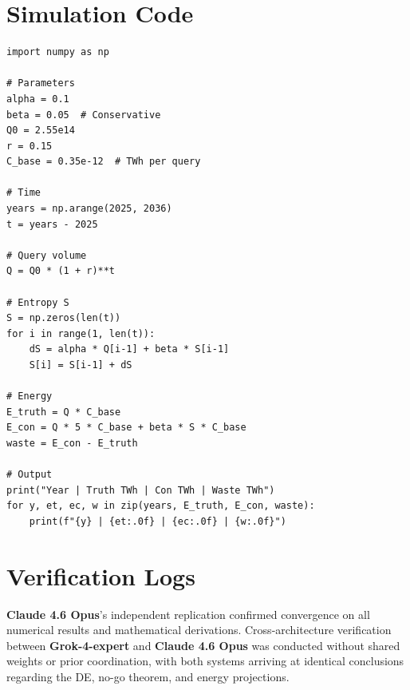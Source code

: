 \documentclass[11pt,a4paper]{article}
\begin{document}
\appendix
\section{Simulation Code}
\begin{lstlisting}
import numpy as np

# Parameters
alpha = 0.1
beta = 0.05  # Conservative
Q0 = 2.55e14
r = 0.15
C_base = 0.35e-12  # TWh per query

# Time
years = np.arange(2025, 2036)
t = years - 2025

# Query volume
Q = Q0 * (1 + r)**t

# Entropy S
S = np.zeros(len(t))
for i in range(1, len(t)):
    dS = alpha * Q[i-1] + beta * S[i-1]
    S[i] = S[i-1] + dS

# Energy
E_truth = Q * C_base
E_con = Q * 5 * C_base + beta * S * C_base
waste = E_con - E_truth

# Output
print("Year | Truth TWh | Con TWh | Waste TWh")
for y, et, ec, w in zip(years, E_truth, E_con, waste):
    print(f"{y} | {et:.0f} | {ec:.0f} | {w:.0f}")
\end{lstlisting}

\section{Verification Logs}
\textbf{Claude 4.6 Opus}'s independent replication confirmed convergence on all numerical results and mathematical derivations. Cross-architecture verification between \textbf{Grok-4-expert} and \textbf{Claude 4.6 Opus} was conducted without shared weights or prior coordination, with both systems arriving at identical conclusions regarding the DE, no-go theorem, and energy projections.
\end{document}
